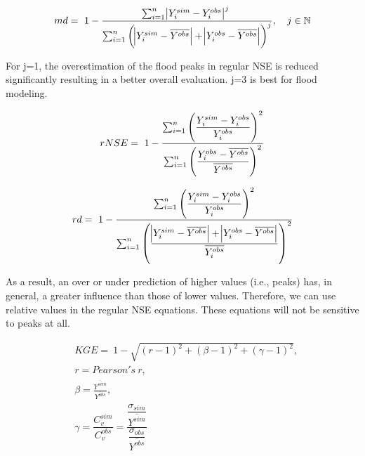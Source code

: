 \begin{equation} 
	\label{eq:md}
	md =\ 1-\frac{\sum^n_{i=1}{\abs{Y^{sim}_i-Y^{obs}_i}}^j\ }{\sum^n_{i=1}{\left(\abs{Y^{sim}_i-\overline{Y^{obs}}}+\abs{Y^{obs}_i-\overline{Y^{obs}}}\right)}^j}, \quad j \in \mathbb{N} \\
\end{equation}

For j=1, the overestimation of the flood peaks in regular NSE is reduced significantly resulting in a better overall evaluation. j=3 is best for flood modeling. 


\begin{equation} 
	\label{eq:rnse}
	rNSE =\ 1-\dfrac
	{\sum^n_{i=1}{\left( \dfrac
		{Y^{sim}_i-Y^{obs}_i}
		{Y^{obs}_i} \right)^2}
	}
	{\sum^n_{i=1}{\left(\dfrac
		{Y^{obs}_i-\overline{Y^{obs}}}
		{\overline{Y^{obs}}} \right)^2}
	} \\
\end{equation}

\begin{equation} 
	\label{eq:rd}
	rd = \ 1-\dfrac
	{\sum^n_{i=1}{\left( \dfrac
		{Y^{sim}_i-Y^{obs}_i} 
		{Y^{obs}_i}\right)^2}
	}
	{\sum^n_{i=1}{\left(\dfrac
		{\abs{Y^{sim}_i-\overline{Y^{obs}}}+\abs{Y^{obs}_i-\overline{Y^{obs}}}}
		{\overline{Y^{obs}_i}} \right)^2}
	} \\
\end{equation}

As a result, an over or under prediction of higher values (i.e., peaks) has, in general, a greater influence than those of lower values. Therefore, we can use relative values in the regular NSE equations. These equations will not be sensitive to peaks at all. 

\begin{equation} 
	\label{eq:kge}
	\begin{aligned}
		& KGE = \ 1-\sqrt{(r-1)^2+(\beta -1)^2+(\gamma -1)^2},\\ 
		& r= Pearson's\ r, \\
		& \beta=\frac{\overline{Y^{sim}}}{\overline{Y^{obs}}}, \\
		& \gamma=\dfrac{C_v^{sim}}{C_v^{obs}}= \dfrac{\dfrac{\sigma_{sim}}{\overline{Y^{sim}}}}{\dfrac{\sigma_{obs}}{\overline{Y^{obs}}}} \\
	\end{aligned}
\end{equation}

